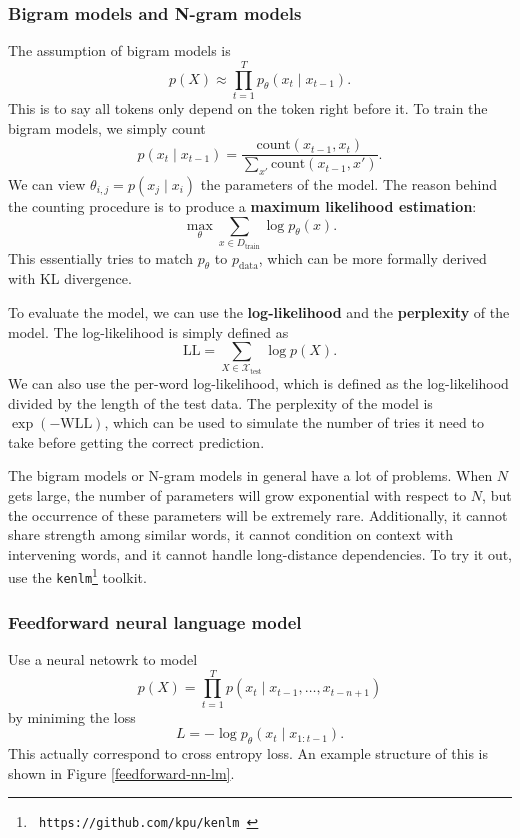 \documentclass[a4paper]{article}
\begin{document}
\subsubsection*{Bigram models and N-gram models} 
The assumption of bigram models is 
\[
p(X) \approx \prod_{t=1}^T p_\theta(x_{t} \mid x_{t - 1}).
\]
This is to say all tokens only depend on the token right 
before it. To train the bigram models, we simply count 
\[
p(x_t \mid x_{t - 1}) = \frac{\text{count} (x_{t-1}, x_t)}
{\sum_{x'} \text{count}(x_{t-1}, x')}.
\]
We can view $\theta_{i, j} = p(x_j \mid x_i)$ the 
parameters of the model. The reason behind the 
counting procedure is to produce a \textbf{maximum 
likelihood estimation}: 
\[
\max_{\theta} \sum_{x \in D_{\text{train}}} 
\log p_\theta(x).
\]
This essentially tries to match $p_\theta$ to $p_{\text{data}}$,
which can be more formally derived with KL divergence.

To evaluate the model, we can use the \textbf{log-likelihood}
and the \textbf{perplexity} of the model. The log-likelihood 
is simply defined as 
\[
  \mathrm{LL} = \sum_{X \in \mathcal{X}_{\text{test}}}
  \log p(X).
\]
We can also use the per-word log-likelihood,
which is defined as the log-likelihood divided by the 
length of the test data.
The perplexity of the model is 
$\exp \left( -\mathrm{WLL} \right)$,
which can be used to simulate the number of tries it need to 
take before getting the correct prediction.

The bigram models or N-gram models in general have a lot of problems.
When $N$ gets large, the number of parameters will grow 
exponential with respect to $N$, but the occurrence of these 
parameters will be extremely rare.
Additionally, it cannot share strength among similar words, 
it cannot condition on context with intervening words, 
and it cannot handle long-distance dependencies. 
To try it out, use the 
\texttt{kenlm}\footnote{\texttt{
  https://github.com/kpu/kenlm
}} toolkit.

\subsubsection*{Feedforward neural language model}
Use a neural netowrk to model 
\[
p(X) = \prod_{t = 1}^{T} p(x_t \mid x_{t-1}, \dots, x_{t-n+1})
\]
by miniming the loss 
\[
L = - \log p_\theta (x_t \mid x_{1 : t - 1}).
\]
This actually correspond to cross entropy loss.
An example structure of this is shown in Figure 
\ref{feedforward-nn-lm}.
\end{document}
